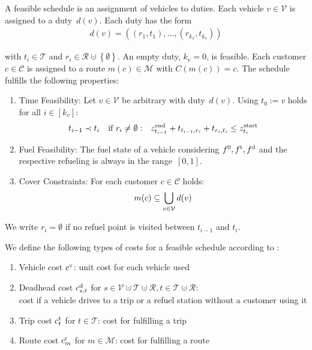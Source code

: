 \begin{definition}
\label{def:feasible_schedule}

A feasible schedule is an assignment of vehicles to duties. Each vehicle ${v\in\mathcal{V}}$ is assigned to a duty~$d(v)$. Each duty has the form
\begin{align*}
	d(v) = \left(\left(r_1,t_1\right),\dots,\left(r_{k_v},t_{k_v}\right)\right)
\end{align*}

with ${t_i\in\mathcal{T}}$ and ${r_i\in\mathcal{R}\cupdot\left\{\emptyset\right\}}$. An empty duty, \ie ${k_v=0}$, is feasible. Each customer ${c\in\mathcal{C}}$ is assigned to a route ${m(c)\in\mathcal{M}}$ with ${C\left(m(c)\right) = c}$. The schedule fulfills the following properties:
\begin{enumerate}
	\item{Time Feasibility:}
Let ${v\in\mathcal{V}}$ be arbitrary with duty~$d(v)$. Using ${t_0 := v}$ holds for all ${i\in[k_v]}$:
\begin{align*}
	t_{i-1}\prec t_i && \text{if } r_i\neq\emptyset : && z^{\operatorname{end}}_{t_{i-1}} + t_{t_{i-1},r_i} + t_{r_i,t_i} \leq z^{\operatorname{start}}_{t_i} 
\end{align*}
	
	\item{Fuel Feasibility:}
The fuel state of a vehicle considering $f^0, f^{\operatorname{t}}, f^{\operatorname{d}}$ and the respective refueling is always in the range~$[0,1]$.

	\item{Cover Constraints:}
For each customer ${c\in\mathcal{C}}$ holds:
\begin{align*}
	m(c) \subseteq \bigcup_{v\in\mathcal{V}} d(v)
\end{align*}

\end{enumerate}

\end{definition}

We write ${r_i = \emptyset}$ if no refuel point is visited between $t_{i-1}$ and $t_i$.

We define the following types of costs for a feasible schedule according to :
\begin{enumerate}
	\item{Vehicle cost $c^{\operatorname{v}}$: unit cost for each vehicle used}
	\item{Deadhead cost $c^{\operatorname{d}}_{s,t}$ for $s\in\mathcal{V}\cupdot\mathcal{T}\cupdot\mathcal{R}, t\in\mathcal{T}\cupdot\mathcal{R}$:\\
	cost if a vehicle drives to a trip or a refuel station without a customer using it}
	\item{Trip cost $c^{\operatorname{t}}_t$ for $t\in\mathcal{T}$: cost for fulfilling a trip}
	\item{Route cost $c^{\operatorname{r}}_m$ for $m\in\mathcal{M}$: cost for fulfilling a route}
\end{enumerate}

